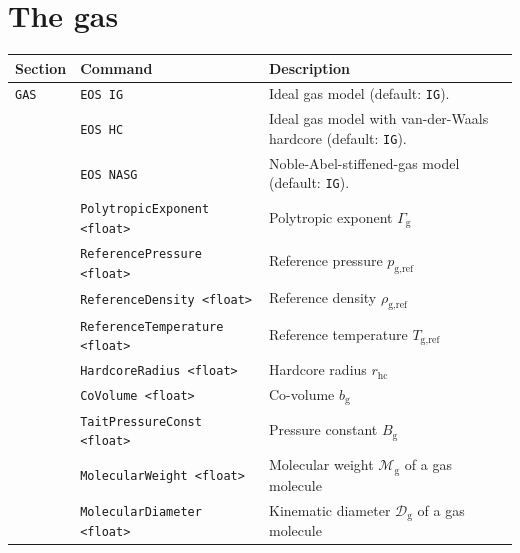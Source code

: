 \section{The gas}
\label{sec:gas}

\vspace{0.8em}

\noindent
\begin{tabular}{p{} p{} p{}}
    \textbf{Section} &\textbf{Command} & \textbf{Description} 
\vspace{1mm} \\ \hline
{\tt GAS} & {\tt EOS IG} & Ideal gas model (default: {\tt IG}).\\ 
& {\tt EOS HC} & Ideal gas model with van-der-Waals hardcore (default: {\tt IG}).\\ 
& {\tt EOS NASG} & Noble-Abel-stiffened-gas model \citep{LeMetayer2016} (default: {\tt IG}).\\
& {\tt PolytropicExponent <float>} & Polytropic exponent $\Gamma_\text{g}$\\
& {\tt ReferencePressure <float>} & Reference pressure $p_\text{g,ref}$\\
& {\tt ReferenceDensity <float>} & Reference density $\rho_\text{g,ref}$\\
& {\tt ReferenceTemperature <float>} & Reference temperature $T_\text{g,ref}$\\
& {\tt HardcoreRadius <float>} & Hardcore radius $r_\text{hc}$\\
& {\tt CoVolume <float>} & Co-volume $b_\text{g}$\\
& {\tt TaitPressureConst <float>} & Pressure constant $B_\text{g}$\\
& {\tt MolecularWeight <float>} & Molecular weight $\mathcal{M}_{\text{g}}$ of a gas molecule \\
& {\tt MolecularDiameter <float>} & Kinematic diameter $\mathcal{D}_{\text{g}}$ of a gas molecule \\
 \hline
\end{tabular} \vspace{1em}


